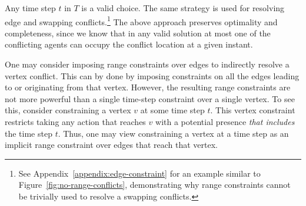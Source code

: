 \documentclass[jair,twoside,11pt,theapa]{article}
\begin{document}
Any time step $t$ in $T$ is a valid choice. 
The same strategy is used for resolving edge and swapping conflicts.\footnote{See Appendix~\ref{appendix:edge-constraint} for an example similar to Figure~\ref{fig:no-range-conflicts}, demonstrating why range constraints cannot be trivially used to resolve a swapping conflicts.}
The above approach preserves optimality and completeness, since we know that in any valid solution at most one of the conflicting agents can occupy the conflict location at a given instant. 




One may consider imposing range constraints over edges to indirectly resolve a vertex conflict. This can by done by imposing constraints on all the edges leading to or originating from that vertex. However, the resulting range constraints are not more powerful than a single time-step constraint over a single vertex. To see this, consider constraining a vertex $v$ at some time step $t$. This vertex constraint restricts taking any action that reaches $v$ with a potential presence \emph{that includes} the time step $t$. Thus, one may view constraining a vertex at a time step as an implicit range constraint over edges that reach that vertex. 





%
%
\end{document}
